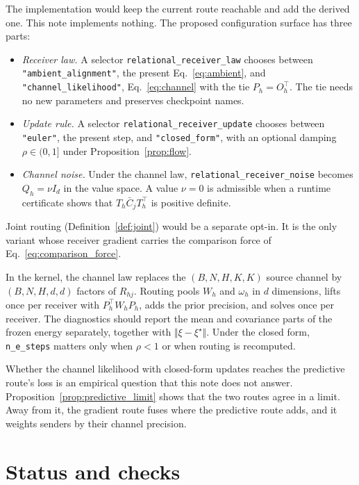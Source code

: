 \documentclass[11pt]{article}
\theoremstyle{definition}
\theoremstyle{remark}
\newcommand{\cfg}[1]{\texttt{#1}}
\begin{document}
The implementation would keep the current route reachable and add the derived one. This note implements nothing. The proposed configuration surface has three parts:
\begin{itemize}
\item \emph{Receiver law.} A selector \cfg{relational\_receiver\_law} chooses between \cfg{"ambient\_alignment"}, the present Eq.~\eqref{eq:ambient}, and \cfg{"channel\_likelihood"}, Eq.~\eqref{eq:channel} with the tie $P_h=O_h^\top$. The tie needs no new parameters and preserves checkpoint names.
\item \emph{Update rule.} A selector \cfg{relational\_receiver\_update} chooses between \cfg{"euler"}, the present step, and \cfg{"closed\_form"}, with an optional damping $\rho\in(0,1]$ under Proposition~\ref{prop:flow}.
\item \emph{Channel noise.} Under the channel law, \cfg{relational\_receiver\_noise} becomes $Q_h=\nu I_d$ in the value space. A value $\nu=0$ is admissible when a runtime certificate shows that $T_h\bar C_jT_h^\top$ is positive definite.
\end{itemize}
Joint routing (Definition~\ref{def:joint}) would be a separate opt-in. It is the only variant whose receiver gradient carries the comparison force of Eq.~\eqref{eq:comparison_force}.

In the kernel, the channel law replaces the $(B,N,H,K,K)$ source channel by $(B,N,H,d,d)$ factors of $R_{hj}$. Routing pools $W_h$ and $\omega_h$ in $d$ dimensions, lifts once per receiver with $P_h^\top W_hP_h$, adds the prior precision, and solves once per receiver. The diagnostics should report the mean and covariance parts of the frozen energy separately, together with $\Vert\xi-\xi^\star\Vert$. Under the closed form, \cfg{n\_e\_steps} matters only when $\rho<1$ or when routing is recomputed.

Whether the channel likelihood with closed-form updates reaches the predictive route's loss is an empirical question that this note does not answer. Proposition~\ref{prop:predictive_limit} shows that the two routes agree in a limit. Away from it, the gradient route fuses where the predictive route adds, and it weights senders by their channel precision.

\section{Status and checks}
\label{sec:status}
\end{document}
